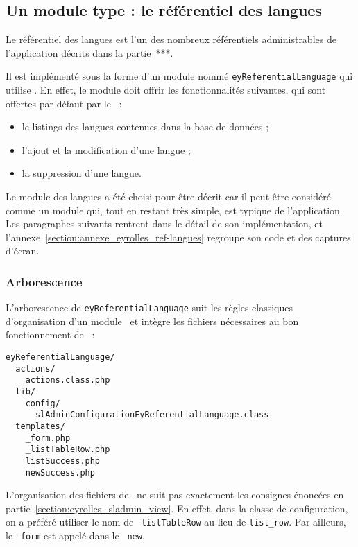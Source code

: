 \subsection{Un module type : le référentiel des langues}
\label{section:eyrolles_ref-langues}

Le référentiel des langues est l'un des nombreux référentiels administrables de l'application décrits dans la partie~***.

Il est implémenté sous la forme d'un module nommé \texttt{ey\-Referential\-Language} qui utilise \asladmin. En effet, le module doit offrir les fonctionnalités suivantes, qui sont offertes par défaut par le \aplugin\ :
\begin{itemize}
	\item le listings des langues contenues dans la base de données ;
	\item l'ajout et la modification d'une langue ;
	\item la suppression d'une langue.
\end{itemize}

Le module des langues a été choisi pour être décrit car il peut être considéré comme un module qui, tout en restant très simple, est typique de l'application. Les paragraphes suivants rentrent dans le détail de son implémentation, et l'annexe~\ref{section:annexe_eyrolles_ref-langues} regroupe son code et des captures d'écran.


\subsubsection{Arborescence}

L'arborescence de \texttt{eyReferentialLanguage} suit les règles classiques d'organisation d'un module \asf\ et intègre les fichiers nécessaires au bon fonctionnement de \asladmin\ :

\begin{verbatim}
eyReferentialLanguage/
  actions/
    actions.class.php
  lib/
    config/
      slAdminConfigurationEyReferentialLanguage.class
  templates/
    _form.php
    _listTableRow.php
    listSuccess.php
    newSuccess.php
\end{verbatim}

L'organisation des fichiers de \atemplate\ ne suit pas exactement les consignes énoncées en partie~\ref{section:eyrolles_sladmin_view}. En effet, dans la classe de configuration, on a préféré utiliser le nom de \apartial\ \texttt{listTableRow} au lieu de \texttt{list\_row}. Par ailleurs, le \apartial\ \texttt{form} est appelé dans le \atemplate\ \texttt{new}.


